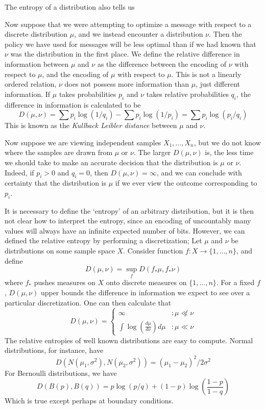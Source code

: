 The entropy of a distribution also tells us 

Now suppose that we were attempting to optimize a message with respect to a discrete distribution $\mu$, and we instead encounter a distribution $\nu$. Then the policy we have used for messages will be less optimal than if we had known that $\nu$ was the distribution in the first place. We define the relative difference in information between $\mu$ and $\nu$ as the difference between the encoding of $\nu$ with respect to $\mu$, and the encoding of $\mu$ with respect to $\mu$. This is not a linearly ordered relation, $\nu$ does not possess more information than $\mu$, just different information. If $\mu$ takes probabilities $p_i$ and $\nu$ takes relative probabilities $q_i$, the difference in information is calculated to be
%
\[ D(\mu, \nu) = \sum p_i \log(1/q_i) - \sum p_i \log(1/p_i) = \sum p_i \log(p_i/q_i) \]
%
This is known as the \emph{Kullback Leibler distance} between $\mu$ and $\nu$.

Now suppose we are viewing independent samples $X_1, \dots, X_n$, but we do not know where the samples are drawn from $\mu$ or $\nu$. The larger $D(\mu, \nu)$ is, the less time we should take to make an accurate decision that the distribution is $\mu$ or $\nu$. Indeed, if $p_i > 0$ and $q_i = 0$, then $D(\mu, \nu) = \infty$, and we can conclude with certainty that the distribution is $\mu$ if we ever view the outcome corresponding to $p_i$.

It is necessary to define the `entropy' of an arbitrary distribution, but it is then not clear how to interpret the entropy, since an encoding of uncountably many values will always have an infinite expected number of bits. However, we can defined the relative entropy by performing a discretization; Let $\mu$ and $\nu$ be distributions on some sample space $X$. Consider function $f: X \to \{ 1, \dots, n \}$, and define
%
\[ D(\mu, \nu) = \sup_f D(f_* \mu, f_* \nu) \]
%
where $f_*$ pushes measures on $X$ onto discrete measures on $\{ 1, \dots, n \}$. For a fixed $f$, $D(\mu, \nu)$ upper bounds the difference in information we expect to see over a particular discretization. One can then calculate that
%
\[ D(\mu, \nu) = \begin{cases} \infty &: \mu \not \ll \nu \\ \int \log(\frac{d\mu}{d\nu}) d\mu &: \mu \ll \nu \end{cases} \]
%
The relative entropies of well known distributions are easy to compute. Normal distributions, for instance, have
%
\[ D(N(\mu_1, \sigma^2), N(\mu_2, \sigma^2)) = (\mu_1 - \mu_2)^2/2\sigma^2 \]
%
For Bernoulli distributions, we have
%
\[ D(B(p), B(q)) = p \log(p/q) + (1-p)\log \left( \frac{1-p}{1-q} \right) \]
%
Which is true except perhaps at boundary conditions.

